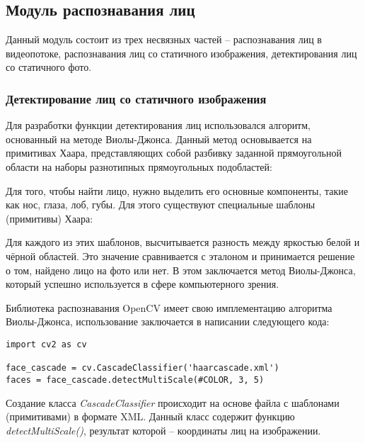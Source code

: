 \subsection{Модуль распознавания лиц}

Данный модуль состоит из трех несвязных частей -- распознавания лиц
в видеопотоке, распознавания лиц со статичного изображения, детектирования лиц
со статичного фото.

\subsubsection{Детектирование лиц со статичного изображения}

Для разработки функции детектирования лиц использовался алгоритм, основанный на
методе Виолы-Джонса. Данный метод основывается на примитивах Хаара,
представляющих собой разбивку заданной прямоугольной области на наборы
разнотипных прямоугольных подобластей:


Для того, чтобы найти лицо, нужно выделить его основные компоненты, такие как
нос, глаза, лоб, губы. Для этого существуют специальные шаблоны (примитивы)
Хаара:


Для каждого из этих шаблонов, высчитывается разность между яркостью белой
и чёрной областей. Это значение сравнивается с эталоном и принимается решение
о том, найдено лицо на фото или нет. В этом заключается метод Виолы-Джонса,
который успешно используется в сфере компьютерного зрения.

Библиотека распознавания OpenCV имеет свою имплементацию алгоритма
Виолы-Джонса, использование заключается в написании следующего кода:

\lstset{language=Python, basicstyle=\normalsize, numbers=left, breaklines=true,
frame=single, showstringspaces=false, columns=fullflexible} 
\begin{lstlisting}
import cv2 as cv

face_cascade = cv.CascadeClassifier('haarcascade.xml')
faces = face_cascade.detectMultiScale(#COLOR, 3, 5)
\end{lstlisting}

Создание класса \textit{CascadeClassifier} происходит на основе файла с шаблонами
(примитивами) в формате XML. Данный класс содержит функцию
\textit{detectMultiScale()}, результат которой -- координаты лиц на
изображении.
